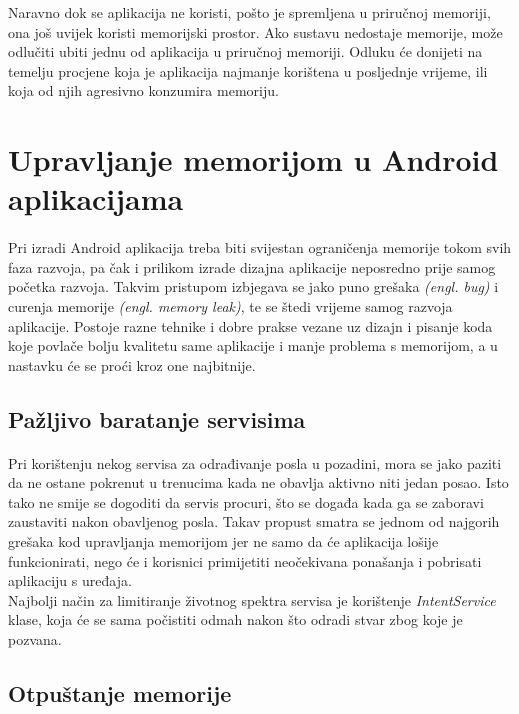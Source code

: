\documentclass[times, utf8, zavrsni]{fer}
\begin{document}
Naravno dok se aplikacija ne koristi, pošto je spremljena u priručnoj memoriji, ona još uvijek koristi memorijski prostor. Ako sustavu nedostaje memorije, može odlučiti ubiti jednu od aplikacija u priručnoj memoriji. Odluku će donijeti na temelju procjene koja je aplikacija najmanje korištena u posljednje vrijeme, ili  koja od njih agresivno konzumira memoriju.

\pagebreak
\section{Upravljanje memorijom u Android aplikacijama}
\paragraph{}
Pri izradi Android aplikacija treba biti svijestan ograničenja memorije tokom svih faza razvoja, pa čak i prilikom izrade dizajna aplikacije neposredno prije samog početka razvoja. Takvim pristupom izbjegava se jako puno grešaka \textit{(engl. bug)} i curenja memorije \textit{(engl. memory leak)}, te se štedi vrijeme samog razvoja aplikacije. Postoje razne tehnike i dobre prakse vezane uz dizajn i pisanje koda koje povlače bolju kvalitetu same aplikacije i manje problema s memorijom, a u nastavku će se proći kroz one najbitnije.

\subsection{Pažljivo baratanje servisima}
\paragraph{}
Pri korištenju nekog servisa za odrađivanje posla u pozadini, mora se jako paziti da  ne ostane pokrenut u trenucima kada ne obavlja aktivno niti jedan posao. Isto tako ne smije se dogoditi da servis procuri, što se događa kada ga se zaboravi zaustaviti nakon obavljenog posla. Takav propust smatra se jednom od najgorih grešaka kod upravljanja memorijom jer ne samo da će aplikacija lošije funkcionirati, nego će i korisnici primijetiti neočekivana ponašanja i pobrisati aplikaciju s uređaja.\\

Najbolji način za limitiranje životnog spektra servisa je korištenje \textit{IntentService} klase, koja će se sama počistiti odmah nakon što odradi stvar zbog koje je pozvana.

\subsection{Otpuštanje memorije}
\end{document}
